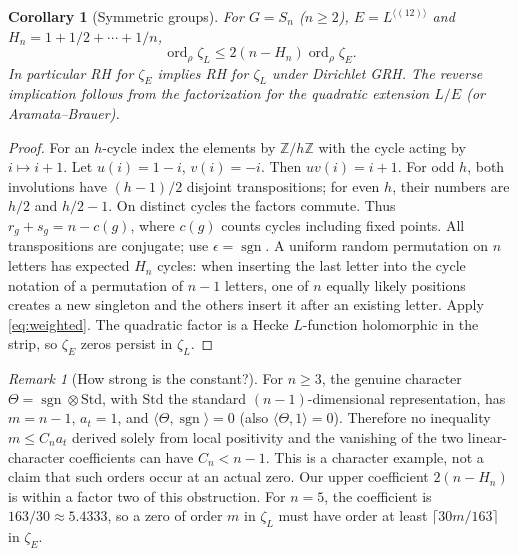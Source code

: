 \documentclass[11pt]{article}
\newtheorem{corollary}[theorem]{Corollary}
\theoremstyle{remark}\newtheorem{remark}[theorem]{Remark}
\newcommand{\ord}{\operatorname{ord}}
\newcommand{\sgn}{\operatorname{sgn}}
\begin{document}
\begin{corollary}[Symmetric groups]\label{cor:sn}
For $G=S_n$ ($n\ge2$), $E=L^{\langle(12)\rangle}$ and $H_n=1+1/2+\cdots+1/n$,
\[
 \ord_\rho\zeta_L\le 2(n-H_n)\ord_\rho\zeta_E.
\]
In particular RH for $\zeta_E$ implies RH for $\zeta_L$ under Dirichlet GRH. The reverse implication follows from the factorization for the quadratic extension $L/E$ (or Aramata--Brauer).
\end{corollary}
\begin{proof}
For an $h$-cycle index the elements by $\mathbb Z/h\mathbb Z$ with the cycle acting by $i\mapsto i+1$. Let $u(i)=1-i$, $v(i)=-i$. Then $uv(i)=i+1$. For odd $h$, both involutions have $(h-1)/2$ disjoint transpositions; for even $h$, their numbers are $h/2$ and $h/2-1$. On distinct cycles the factors commute. Thus $r_g+s_g=n-c(g)$, where $c(g)$ counts cycles including fixed points. All transpositions are conjugate; use $\epsilon=\sgn$. A uniform random permutation on $n$ letters has expected $H_n$ cycles: when inserting the last letter into the cycle notation of a permutation of $n-1$ letters, one of $n$ equally likely positions creates a new singleton and the others insert it after an existing letter. Apply \eqref{eq:weighted}. The quadratic factor is a Hecke $L$-function holomorphic in the strip, so $\zeta_E$ zeros persist in $\zeta_L$.
\end{proof}

\begin{remark}[How strong is the constant?]
For $n\ge3$, the genuine character $\Theta=\sgn\otimes\mathrm{Std}$, with $\mathrm{Std}$ the standard $(n-1)$-dimensional representation, has $m=n-1$, $a_t=1$, and $\langle\Theta,\sgn\rangle=0$ (also $\langle\Theta,1\rangle=0$). Therefore no inequality $m\le C_n a_t$ derived solely from local positivity and the vanishing of the two linear-character coefficients can have $C_n<n-1$. This is a character example, not a claim that such orders occur at an actual zero. Our upper coefficient $2(n-H_n)$ is within a factor two of this obstruction. For $n=5$, the coefficient is $163/30\approx5.4333$, so a zero of order $m$ in $\zeta_L$ must have order at least $\lceil30m/163\rceil$ in $\zeta_E$.
\end{remark}
\end{document}

